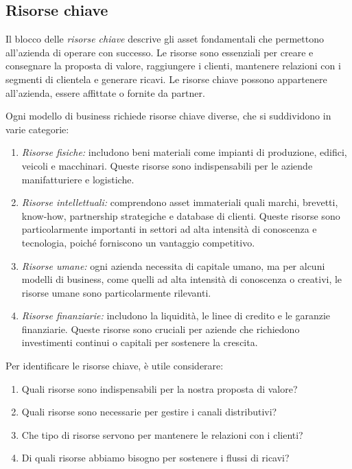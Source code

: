 \subsection*{Risorse chiave}
Il blocco delle \textit{risorse chiave} descrive gli asset fondamentali che permettono all’azienda di operare con successo. Le risorse sono essenziali per creare e consegnare la proposta di valore, raggiungere i clienti, mantenere relazioni con i segmenti di clientela e generare ricavi. Le risorse chiave possono appartenere all’azienda, essere affittate o fornite da partner.

Ogni modello di business richiede risorse chiave diverse, che si suddividono in varie categorie:
\begin{enumerate}
    \item \textit{Risorse fisiche:} includono beni materiali come impianti di produzione, edifici, veicoli e macchinari. Queste risorse sono indispensabili per le aziende manifatturiere e logistiche.
    \item \textit{Risorse intellettuali:} comprendono asset immateriali quali marchi, brevetti, know-how, partnership strategiche e database di clienti. Queste risorse sono particolarmente importanti in settori ad alta intensità di conoscenza e tecnologia, poiché forniscono un vantaggio competitivo.
    \item \textit{Risorse umane:} ogni azienda necessita di capitale umano, ma per alcuni modelli di business, come quelli ad alta intensità di conoscenza o creativi, le risorse umane sono particolarmente rilevanti.
    \item \textit{Risorse finanziarie:} includono la liquidità, le linee di credito e le garanzie finanziarie. Queste risorse sono cruciali per aziende che richiedono investimenti continui o capitali per sostenere la crescita.
\end{enumerate}
Per identificare le risorse chiave, è utile considerare:
\begin{enumerate}
    \item Quali risorse sono indispensabili per la nostra proposta di valore?
    \item Quali risorse sono necessarie per gestire i canali distributivi?
    \item Che tipo di risorse servono per mantenere le relazioni con i clienti?
    \item Di quali risorse abbiamo bisogno per sostenere i flussi di ricavi?
\end{enumerate}

